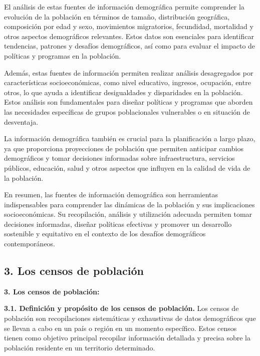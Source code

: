 \documentclass[8pt,a4paper]{beamer}
\begin{document}
{\begin{frame}{}
El análisis de estas fuentes de información demográfica permite comprender la evolución de la población en términos de tamaño, distribución geográfica, composición por edad y sexo, movimientos migratorios, fecundidad, mortalidad y otros aspectos demográficos relevantes. Estos datos son esenciales para identificar tendencias, patrones y desafíos demográficos, así como para evaluar el impacto de políticas y programas en la población.

\end{frame}

\begin{frame}{}
\justifying
Además, estas fuentes de información permiten realizar análisis desagregados por características socioeconómicas, como nivel educativo, ingresos, ocupación, entre otros, lo que ayuda a identificar desigualdades y disparidades en la población. Estos análisis son fundamentales para diseñar políticas y programas que aborden las necesidades específicas de grupos poblacionales vulnerables o en situación de desventaja.

La información demográfica también es crucial para la planificación a largo plazo, ya que proporciona proyecciones de población que permiten anticipar cambios demográficos y tomar decisiones informadas sobre infraestructura, servicios públicos, educación, salud y otros aspectos que influyen en la calidad de vida de la población.

En resumen, las fuentes de información demográfica son herramientas indispensables para comprender las dinámicas de la población y sus implicaciones socioeconómicas. Su recopilación, análisis y utilización adecuada permiten tomar decisiones informadas, diseñar políticas efectivas y promover un desarrollo sostenible y equitativo en el contexto de los desafíos demográficos contemporáneos.
\end{frame}

\subsection{3. Los censos de población}
\begin{frame}{\textbf{3. Los censos de población:}}
\begin{block}{\textbf{3.1. Definición y propósito de los censos de población.}}
\justifying
Los censos de población son recopilaciones sistemáticas y exhaustivas de datos demográficos que se llevan a cabo en un país o región en un momento específico. Estos censos tienen como objetivo principal recopilar información detallada y precisa sobre la población residente en un territorio determinado.


\end{block}
\end{frame}}
\end{document}
